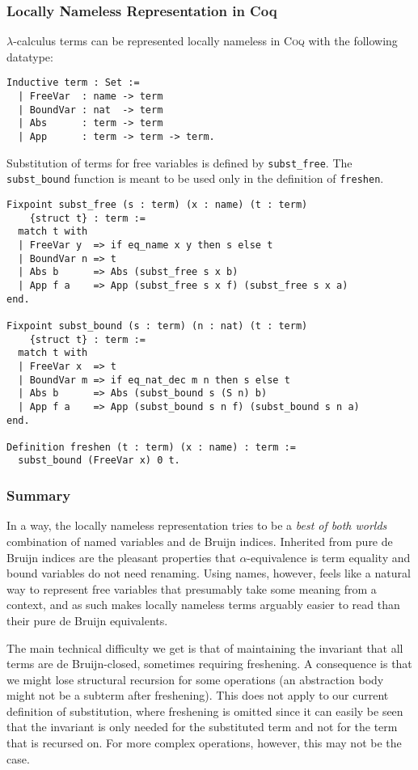 \documentclass[a4paper,11pt]{article}
\newcommand{\name}[1]{\textsc{#1}\xspace}
\def\Coq{\name{Coq}}
\begin{document}
\subsubsection*{Locally Nameless Representation in Coq}

$\lambda$-calculus terms can be represented locally nameless in \Coq with
the following datatype:
\begin{lstlisting}
Inductive term : Set :=
  | FreeVar  : name -> term
  | BoundVar : nat  -> term
  | Abs      : term -> term
  | App      : term -> term -> term.
\end{lstlisting}
Substitution of terms for free variables is defined by
\lstinline{subst_free}. The \lstinline{subst_bound} function is meant
to be used only in the definition of \lstinline{freshen}.
\begin{lstlisting}
Fixpoint subst_free (s : term) (x : name) (t : term)
    {struct t} : term :=
  match t with
  | FreeVar y  => if eq_name x y then s else t
  | BoundVar n => t
  | Abs b      => Abs (subst_free s x b)
  | App f a    => App (subst_free s x f) (subst_free s x a)
end.

Fixpoint subst_bound (s : term) (n : nat) (t : term)
    {struct t} : term :=
  match t with
  | FreeVar x  => t
  | BoundVar m => if eq_nat_dec m n then s else t
  | Abs b      => Abs (subst_bound s (S n) b)
  | App f a    => App (subst_bound s n f) (subst_bound s n a)
end.

Definition freshen (t : term) (x : name) : term :=
  subst_bound (FreeVar x) 0 t.
\end{lstlisting}

\subsubsection*{Summary}

In a way, the locally nameless representation tries to be a
\emph{best of both worlds} combination of named variables and de Bruijn
indices.
Inherited from pure de Bruijn indices are the pleasant properties that
$\alpha$-equivalence is term equality and bound variables do not need
renaming.
Using names, however, feels like a natural way to represent free
variables that presumably take some meaning from a context, and as such
makes locally nameless terms arguably easier to read than their pure de
Bruijn equivalents.

The main technical difficulty we get is that of maintaining the invariant
that all terms are de Bruijn-closed, sometimes requiring freshening.
A consequence is that we might lose structural recursion for some
operations (an abstraction body might not be a subterm after freshening).
This does not apply to our current definition of substitution, where
freshening is omitted since it can easily be seen that the invariant is
only needed for the substituted term and not for the term that is recursed
on.
For more complex operations, however, this may not be the case.
\end{document}

